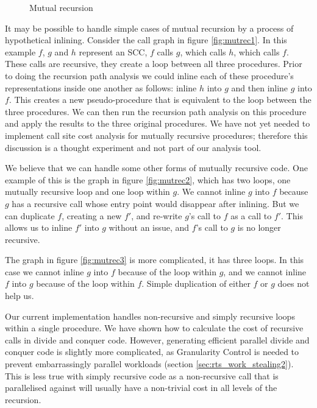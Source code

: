 \begin{figure}
\begin{center}
%
\hspace{0.09\textwidth}
%
%
\hspace{0.09\textwidth}
%
\end{center}
\caption{Mutual recursion}
\label{fig:mutrec}
\end{figure}

It may be possible to handle simple cases of mutual recursion by a process
of hypothetical inlining.
Consider the call graph in figure \ref{fig:mutrec1}.
In this example $f$, $g$ and $h$ represent an SCC,
$f$ calls $g$, which calls $h$, which calls $f$.
These calls are recursive, they create a loop between all three procedures.
Prior to doing the recursion path analysis we could inline each of these
procedure's representations inside one another as follows:
inline $h$ into $g$ and then inline $g$ into $f$.
This creates a new pseudo-procedure that is equivalent to the loop between the
three procedures.
We can then run the recursion path analysis on this procedure and apply the
results to the three original procedures.
We have not yet needed to implement call site cost analysis for mutually
recursive procedures;
therefore this discussion is a thought experiment and not part of our
analysis tool.

We believe that we can handle some other forms of mutually recursive code.
One example of this is  the graph in figure \ref{fig:mutrec2},
which has two loops, one mutually recursive loop and one loop within $g$.
We cannot inline $g$ into $f$ because $g$ has a recursive call whose
entry point would disappear after inlining.
But we can duplicate $f$, creating a new $f\prime$, and re-write $g$'s call
to $f$ as a call to $f\prime$.
This allows us to inline $f\prime$ into $g$ without an issue, and $f$'s call
to $g$ is no longer recursive.

The graph in figure \ref{fig:mutrec3} is more complicated,
it has three loops.
In this case we cannot inline $g$ into $f$ because of the loop within $g$,
and we cannot inline $f$ into $g$ because of the loop within $f$.
Simple duplication of either $f$ or $g$ does not help us.

Our current implementation handles non-recursive and simply recursive
loops within a single procedure.
We have shown how to calculate the cost of recursive calls in divide and
conquer code.
However, generating efficient parallel divide and conquer code is slightly
more complicated,
as Granularity Control is needed to prevent embarrassingly parallel
workloads (section \ref{sec:rts_work_stealing2}).
This is less true with simply recursive code as a non-recursive call that is
parallelised against will usually have a non-trivial cost in all levels of
the recursion.

